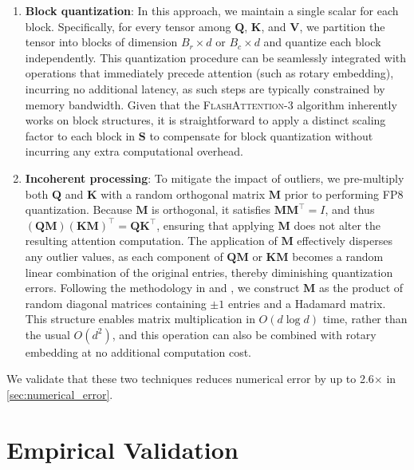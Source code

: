 \begin{enumerate}

\item \textbf{Block quantization}: In this approach, we maintain a single scalar for each block. Specifically, for every tensor among $\mathbf{Q}$, $\mathbf{K}$, and $\mathbf{V}$, we partition the tensor into blocks of dimension $B_r \times d$ or $B_c \times d$ and quantize each block independently. This quantization procedure can be seamlessly integrated with operations that immediately precede attention (such as rotary embedding), incurring no additional latency, as such steps are typically constrained by memory bandwidth. Given that the \textsc{FlashAttention-3} algorithm inherently works on block structures, it is straightforward to apply a distinct scaling factor to each block in $\mathbf{S}$ to compensate for block quantization without incurring any extra computational overhead.

\item \textbf{Incoherent processing}: To mitigate the impact of outliers, we pre-multiply both $\mathbf{Q}$ and $\mathbf{K}$ with a random orthogonal matrix $\mathbf{M}$ prior to performing FP8 quantization. Because $\mathbf{M}$ is orthogonal, it satisfies $\mathbf{M} \mathbf{M}^\top = I$, and thus $(\mathbf{Q} \mathbf{M}) (\mathbf{K} \mathbf{M})^\top = \mathbf{Q} \mathbf{K}^\top$, ensuring that applying $\mathbf{M}$ does not alter the resulting attention computation. The application of $\mathbf{M}$ effectively disperses any outlier values, as each component of $\mathbf{Q} \mathbf{M}$ or $\mathbf{K} \mathbf{M}$ becomes a random linear combination of the original entries, thereby diminishing quantization errors. Following the methodology in \citet{chee2024quip} and \citet{tseng2024quip}, we construct $\mathbf{M}$ as the product of random diagonal matrices containing $\pm 1$ entries and a Hadamard matrix. This structure enables matrix multiplication in $O(d \log d)$ time, rather than the usual $O(d^2)$, and this operation can also be combined with rotary embedding at no additional computation cost.
\end{enumerate}

We validate that these two techniques reduces numerical error by up to 2.6$\times$ in \cref{sec:numerical_error}.

\section{Empirical Validation}
\label{sec:exp}

